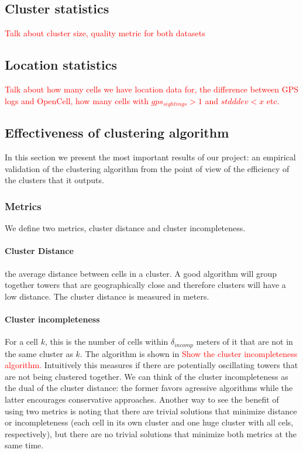 \documentclass[letterpaper, 11pt, conference]{ieeeconf}
\newcommand{\xxx}[1]{\textcolor{red}{#1}}
\begin{document}
\subsection{Cluster statistics}

\xxx{Talk about cluster size, quality metric for both datasets}

\subsection{Location statistics}

\xxx{Talk about how many cells we have location data for, the difference between GPS logs and OpenCell, how many cells with $gps_{sightings} > 1$ and $stdddev < x$ etc.}

\subsection{Effectiveness of clustering algorithm}

In this section we present the most important results of our project: an empirical validation of the clustering algorithm from the point of view of the efficiency of the clusters that it outputs.

\subsubsection{Metrics}

We define two metrics, cluster distance and cluster incompleteness.

\paragraph{Cluster Distance} the average distance between cells in a cluster. A good algorithm will group together towers that are geographically close and therefore clusters will have a low distance. The cluster distance is measured in meters.

\paragraph{Cluster incompleteness} For a cell $k$, this is the number of cells within $\delta_{incomp}$ meters of it that are not in the same cluster as $k$. The algorithm is shown in \xxx{Show the cluster incompleteness algorithm.} Intuitively this measures if there are potentially oscillating towers that are not being clustered together. We can think of the cluster incompleteness as the dual of the cluster distance: the former favors agressive algorithms while the latter encourages conservative approaches. Another way to see the benefit of using two metrics is noting that there are trivial solutions that minimize distance or incompleteness (each cell in its own cluster and one huge cluster with all cels, respectively), but there are no trivial solutions that minimize both metrics at the same time.
\end{document}
